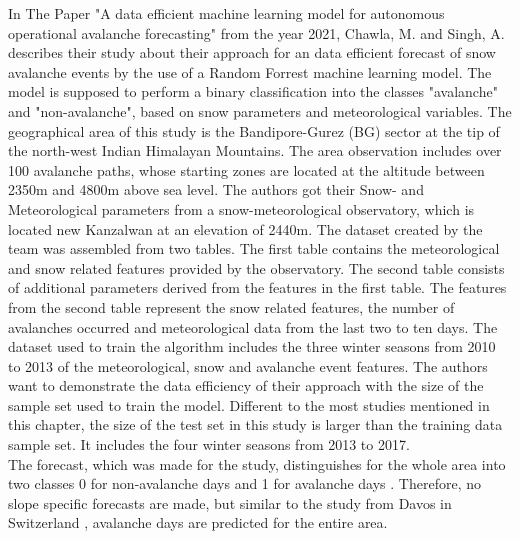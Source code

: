 \documentclass[../masterarbeit.tex]{subfiles}
\begin{document}
In The Paper "A data efficient machine learning model for autonomous operational avalanche forecasting" \textcite[]{nhess-2021-106} from the year 2021, Chawla, M. and Singh, A. describes their study about their approach for an data efficient forecast of snow avalanche events by the use of a Random Forrest machine learning model. The model is supposed to perform a binary classification into the classes "avalanche" and "non-avalanche", based on snow parameters and meteorological variables. 
The geographical area of this study is the Bandipore-Gurez (BG) sector at the tip of the north-west Indian Himalayan Mountains. The area observation includes over 100 avalanche paths, whose starting zones are located at the altitude between 2350m and 4800m above sea level. The authors got their Snow- and Meteorological parameters from a snow-meteorological observatory, which is located new Kanzalwan at an elevation of 2440m. The dataset created by the team was assembled from two tables. The first table contains the meteorological and snow related features provided by the observatory. The second table consists of additional parameters derived from the features in the first table. The features from the second table represent the snow related features, the number of avalanches occurred and meteorological data from the last two to ten days. The dataset used to train the algorithm includes the three winter seasons from 2010 to 2013 of the meteorological, snow and avalanche event features. The authors want to demonstrate the data efficiency of their approach with the size of the sample set used to train the model.  Different to the most studies mentioned in this chapter, the size of the test set in this study is larger than the training data sample set. It includes the four winter seasons from 2013 to 2017. \autocite[]{nhess-2021-106} \\
The forecast, which was made for the study, distinguishes for the whole area into two classes 0 for non-avalanche days and 1 for avalanche days \textcite[]{nhess-2021-106}. Therefore, no slope specific forecasts are made, but similar to the study from Davos in Switzerland \textcite[]{Harvey:2016}, avalanche days are predicted for the entire area. \\
\end{document}
